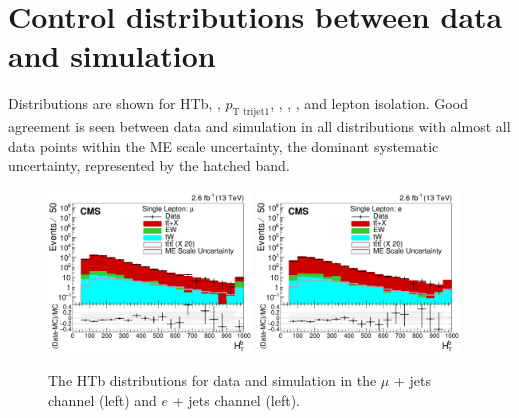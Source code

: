 \section{Control distributions between data and simulation}
Distributions are shown for HTb, \HTrat, $p_{\textrm{T trijet1}}$, \nLtags, \nTtags, \redhadmass, \HTX and lepton isolation. Good agreement is seen between data and simulation in all distributions with almost all data points within the ME scale uncertainty, the dominant systematic uncertainty, represented by the hatched band.

\begin{figure}[ht!]
    \includegraphics[width=0.48\textwidth]{images/Run2/HTb_StackLogY.pdf}
    \includegraphics[width=0.48\textwidth]{images/Run2/HTb_StackLogY_e.pdf}
    \caption{The HTb distributions for data and simulation in the $\mu$ + jets channel (left) and $e$ + jets channel (left).}
    \label{fig:HTB}
\end{figure}


